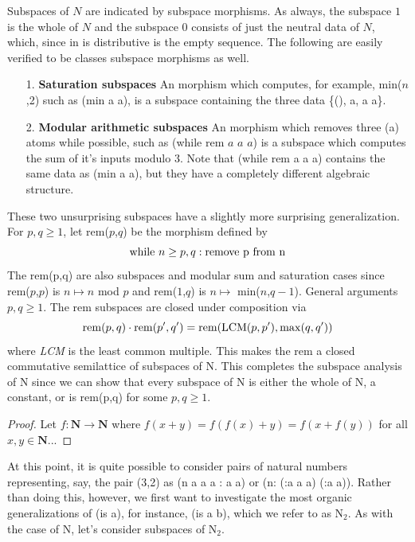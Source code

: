 \documentclass[11pt]{article}
\begin{document}
    Subspaces of $N$ are indicated by subspace morphisms.  As always, the subspace $1$ is the whole of $N$ and the subspace $0$ consists of just the neutral data of $N$, which, 
since in is distributive is the empty sequence.  The following are easily verified to be classes subspace morphisms as well.  
\begin{itemize} 
\item [1.] {\bf Saturation subspaces} An morphism which computes, for example, min($n$,2) such as (min a a), is a subspace containing the three data \{(), a, a a\}. 
\item [2.] {\bf Modular arithmetic subspaces} An morphism which removes three (a) atoms while possible, such as (while rem $a$ $a$ $a$) is a subspace which computes the sum of it's inputs modulo 3.  Note 
that (while rem a a a) contains the same data as (min a a), but they have a completely different algebraic structure.  
\end{itemize}
These two unsurprising subspaces have a slightly more surprising generalization.  For $p,q\ge 1$, let rem($p$,$q$) be the morphism defined by 
\begin{equation}
{\rm while}\ n\ge p,q: {\rm remove\ p\ from\ n}
\end{equation}
The rem(p,q) are also subspaces and modular sum and saturation cases since rem($p$,$p$) is $n\mapsto n$ mod $p$ and rem($1$,$q$) is $n\mapsto$ min($n$,$q-1$).   General arguments $p,q\ge 1$.  The rem subspaces are closed under composition via 
\begin{equation}
{\rm rem}(p,q)\cdot {\rm rem}(p',q') = {\rm rem}({\rm LCM}(p,p'),{\rm max}(q,q'))
\end{equation}
where {\it LCM} is the least common multiple.  This makes the rem a closed commutative semilattice of subspaces of N.  
This completes the subspace analysis of N since we can show that every subspace of N is either the whole of N, a constant, or is rem(p,q) for some $p,q\ge1$. 

\begin{proof}
Let $f:{\mathbf N}\rightarrow{\mathbf N}$ where $f(x+y)=f(f(x)+y)=f(x+f(y))$ for all $x,y\in\mathbf N$...
\end{proof}

At this point, it is quite possible to consider pairs of natural numbers representing, say, the pair (3,2) as (n a a a : a a) or (n: (:a a a) (:a a)).  Rather than doing this, however, we 
first want to investigate the most organic generalizations of (is a), for instance, (is a b), which we refer to as N$_2$.  
As with the case of N, let's consider subspaces of N$_2$.  
\end{document}
